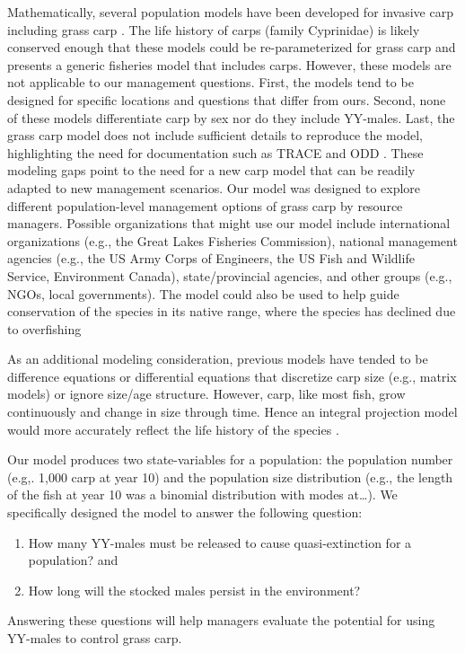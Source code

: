 \documentclass{article}[12pt]
\begin{document}
Mathematically, several population models have been developed for invasive carp \citep[e.g., silver carp, bighead carp, common carp;][]{lorenzen1995population, williamson2005growth, tsehaye2013prospects,cuddington2014could} including grass carp \citep{kirk2000population}.
The life history of carps (family Cyprinidae) is likely conserved enough that these models could be re-parameterized for grass carp and \citet{lorenzen1995population} presents a generic fisheries model that includes carps.
However, these models are not applicable to our management questions. 
First, the models tend to be designed for specific locations and questions that differ from ours.
Second, none of these models differentiate carp by sex nor do they include YY-males.
Last, the grass carp model \citet{kirk2000population} does not include sufficient details to reproduce the model, highlighting the need for documentation such as TRACE and ODD \citep{schmolke2010ecological, augusiak2014merging}.
These modeling gaps point to the need for a new carp model that can be readily adapted to new management scenarios. 
Our model was designed to explore different population-level management options of grass carp by resource managers.
Possible organizations that might use our model include international organizations (e.g., the Great Lakes Fisheries Commission), national management agencies (e.g., the US Army Corps of Engineers, the US Fish and Wildlife Service, Environment Canada), state/provincial agencies, and other groups (e.g., NGOs, local governments). 
The model could also be used to help guide conservation of the species in its native range, where the species has declined due to overfishing \citep{shireman1983synopsis}

As an additional modeling consideration, previous models have tended to be difference equations or differential equations that discretize carp size (e.g., matrix models) or ignore size/age structure. 
However, carp, like most fish, grow continuously and change in size through time. 
Hence an integral projection model would more accurately reflect the life history of the species \citep{ellner2006integral, ramula2009integral, merow2014advancing}. 


Our model produces two state-variables for a population: the population number (e.g,. 1,000 carp at year 10) and the population size distribution (e.g., the length of the fish at year 10 was a binomial distribution with modes at\ldots).
We specifically designed the model to answer the following question:
\begin{enumerate}
\item How many YY-males must be released to cause quasi-extinction for a population? and
\item How long will the stocked males persist in the environment?
\end{enumerate} 
Answering these questions will help managers evaluate the potential for using YY-males to control grass carp.  
\end{document}
